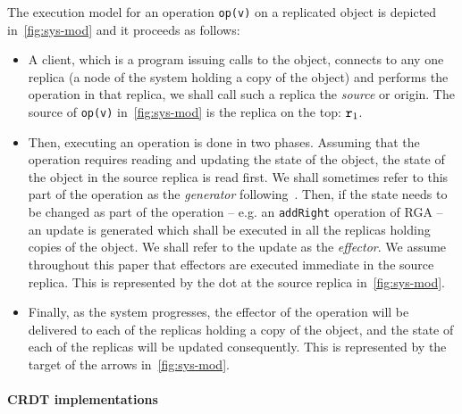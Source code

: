 The execution model for an operation \lstinline|op(v)| on a replicated
object is depicted in~\autoref{fig:sys-mod} and it proceeds as follows:
\begin{itemize}
\item A client, which is a program issuing calls to the object, connects
  to any one replica (a node of the system holding a copy of the object)
  and performs the operation in that replica, we shall call such a
  replica the \emph{source} or origin. The source of \lstinline|op(v)|
  in~\autoref{fig:sys-mod} is the replica on the top: $\mathtt{r}_1$.
\item Then, executing an operation is done in two phases.
  Assuming that the operation requires reading and updating the state
  of the object, the state of the object in the source replica is read
  first.
  We shall sometimes refer to this part of the operation as the
  \emph{generator} following~\cite{ShapiroPBZ11}.
  Then, if the state needs to be changed as part of the operation --
  e.g. an \lstinline|addRight| operation of RGA -- an update is
  generated which shall be executed in all the replicas holding copies of the
  object.
  We shall refer to the update as the \emph{effector}.
  We assume throughout this paper that effectors are executed
  immediate in the source replica.
  This is represented by the dot at the source replica
  in~\autoref{fig:sys-mod}.
\item Finally, as the system progresses, the effector of the operation
  will be delivered to each of the replicas holding a copy of the
  object, and the state of each of the replicas will be updated
  consequently.
  This is represented by the target of the arrows
  in~\autoref{fig:sys-mod}.
\end{itemize}

\paragraph{CRDT implementations}

